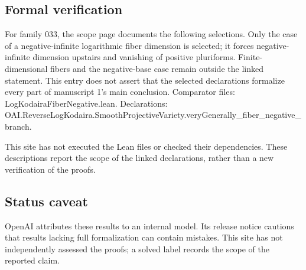 \documentclass[11pt]{article}
\begin{document}
\subsection{Formal verification}
For family 033, the scope page documents the following selections. Only the case of a negative-infinite logarithmic fiber dimension is selected; it forces negative-infinite dimension upstairs and vanishing of positive pluriforms. Finite-dimensional fibers and the negative-base case remain outside the linked statement. This entry does not assert that the selected declarations formalize every part of manuscript 1's main conclusion. Comparator files: LogKodairaFiberNegative.lean. Declarations: OAI.ReverseLogKodaira.SmoothProjectiveVariety.veryGenerally\_fiber\_negative\_branch.

This site has not executed the Lean files or checked their dependencies. These descriptions report the scope of the linked declarations, rather than a new verification of the proofs.

\subsection{Status caveat}
OpenAI attributes these results to an internal model. Its release notice cautions that results lacking full formalization can contain mistakes. This site has not independently assessed the proofs; a solved label records the scope of the reported claim.
\end{document}
